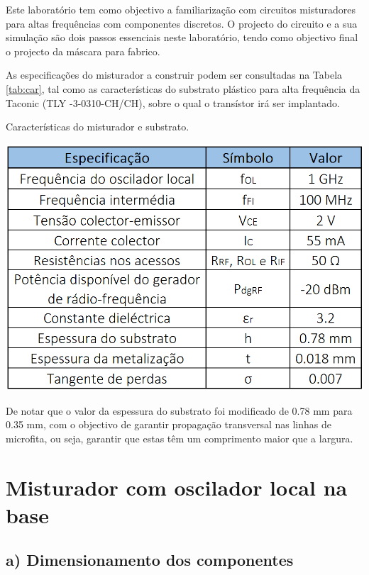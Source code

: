 \documentclass[11pt]{article}
\numberwithin{equation}{section}
\begin{document}
Este laboratório tem como objectivo a familiarização com circuitos misturadores para altas frequências com componentes discretos. O projecto do circuito e a sua simulação são dois passos essenciais neste laboratório, tendo como objectivo final o projecto da máscara para fabrico.

As especificações do misturador a construir podem ser consultadas na Tabela \ref{tab:car}, tal como as características do substrato plástico para alta frequência da Taconic (TLY -3-0310-CH/CH), sobre o qual o transístor irá ser implantado. 

\begin{table}[h]
\centering
\caption{Características do misturador e substrato.}
\vspace{-1.5mm}
\includegraphics[keepaspectratio=true, scale=0.35]{teoricas/table1}
\label{tab:car}
\end{table}

De notar que o valor da espessura do substrato foi modificado de 0.78 mm para 0.35 mm, com o objectivo de garantir propagação transversal nas linhas de microfita, ou seja, garantir que estas têm um comprimento maior que a largura. 

\section{Misturador com oscilador local na base}

\subsection{a) Dimensionamento dos componentes}
\end{document}
